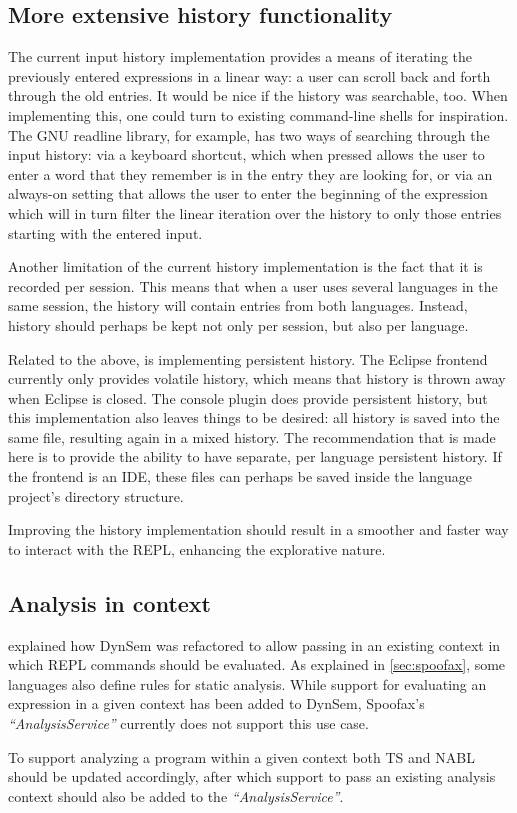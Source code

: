 \subsection{More extensive history functionality}

The current input history implementation provides a means of iterating the
previously entered expressions in a linear way: a user can scroll back and forth
through the old entries. It would be nice if the history was searchable, too.
When implementing this, one could turn to existing command-line shells for
inspiration. The GNU readline library, for example, has two ways of searching
through the input history: via a keyboard shortcut, which when pressed allows
the user to enter a word that they remember is in the entry they are looking
for, or via an always-on setting that allows the user to enter the beginning of
the expression which will in turn filter the linear iteration over the
history to only those entries starting with the entered input.

Another limitation of the current history implementation is the fact that it is
recorded per session. This means that when a user uses several languages in the
same session, the history will contain entries from both languages. Instead,
history should perhaps be kept not only per session, but also per language.

Related to the above, is implementing persistent history. The Eclipse frontend
currently only provides volatile history, which means that history is thrown
away when Eclipse is closed. The console plugin does provide persistent history,
but this implementation also leaves things to be desired: all history is saved
into the same file, resulting again in a mixed history. The recommendation that
is made here is to provide the ability to have separate, per language
persistent history. If the frontend is an IDE, these files can perhaps be saved
inside the language project's directory structure.

Improving the history implementation should result in a smoother and
faster way to interact with the REPL, enhancing the explorative nature.

\subsection{Analysis in context}

 explained how DynSem was refactored to allow passing
in an existing context in which REPL commands should be evaluated. As explained
in \cref{sec:spoofax}, some languages also define rules for static analysis.
While support for evaluating an expression in a given context has been added to
DynSem, Spoofax's \textit{``AnalysisService''} currently does not support this
use case.

To support analyzing a program within a given context both TS and NABL should
be updated accordingly, after which support to pass an existing analysis
context should also be added to the \textit{``AnalysisService''}.

